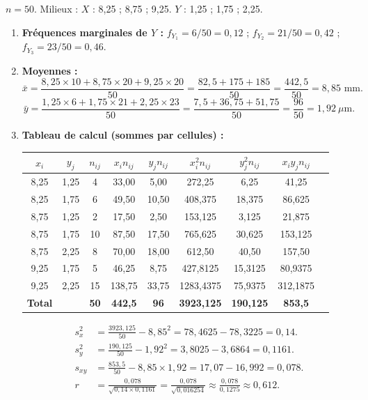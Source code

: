 \documentclass[11pt]{article}
\begin{document}
\begin{corrige}
$n=50$. Milieux : $X$ : 8,25 ; 8,75 ; 9,25. $Y$ : 1,25 ; 1,75 ; 2,25.

\begin{enumerate}
\item \textbf{Fréquences marginales de $Y$ :}
$f_{Y_1} = 6/50 = 0,12$ ; $f_{Y_2} = 21/50 = 0,42$ ; $f_{Y_3} = 23/50 = 0,46$.

\item \textbf{Moyennes :}
\[
\bar{x} = \frac{8,25\times10 + 8,75\times20 + 9,25\times20}{50} = \frac{82,5 + 175 + 185}{50} = \frac{442,5}{50} = 8,85 \text{ mm}.
\]
\[
\bar{y} = \frac{1,25\times6 + 1,75\times21 + 2,25\times23}{50} = \frac{7,5 + 36,75 + 51,75}{50} = \frac{96}{50} = 1,92 \ \mu\text{m}.
\]

\item \textbf{Tableau de calcul (sommes par cellules) :}
\begin{center}
\begin{tabular}{|c|c|c|c|c|c|c|c|c|}\hline
$x_i$ & $y_j$ & $n_{ij}$ & $x_i n_{ij}$ & $y_j n_{ij}$ & $x_i^2 n_{ij}$ & $y_j^2 n_{ij}$ & $x_i y_j n_{ij}$ \\ \hline
8,25 & 1,25 & 4 & 33,00 & 5,00 & 272,25 & 6,25 & 41,25 \\
8,25 & 1,75 & 6 & 49,50 & 10,50 & 408,375 & 18,375 & 86,625 \\
8,75 & 1,25 & 2 & 17,50 & 2,50 & 153,125 & 3,125 & 21,875 \\
8,75 & 1,75 & 10 & 87,50 & 17,50 & 765,625 & 30,625 & 153,125 \\
8,75 & 2,25 & 8 & 70,00 & 18,00 & 612,50 & 40,50 & 157,50 \\
9,25 & 1,75 & 5 & 46,25 & 8,75 & 427,8125 & 15,3125 & 80,9375 \\
9,25 & 2,25 & 15 & 138,75 & 33,75 & 1283,4375 & 75,9375 & 312,1875 \\ \hline
\textbf{Total} & & \textbf{50} & \textbf{442,5} & \textbf{96} & \textbf{3923,125} & \textbf{190,125} & \textbf{853,5} \\ \hline
\end{tabular}
\end{center}

\[
\begin{aligned}
s_x^2 &= \frac{3923,125}{50} - 8,85^2 = 78,4625 - 78,3225 = 0,14. \\
s_y^2 &= \frac{190,125}{50} - 1,92^2 = 3,8025 - 3,6864 = 0,1161. \\
s_{xy} &= \frac{853,5}{50} - 8,85 \times 1,92 = 17,07 - 16,992 = 0,078. \\
r &= \frac{0,078}{\sqrt{0,14 \times 0,1161}} = \frac{0,078}{\sqrt{0,016254}} \approx \frac{0,078}{0,1275} \approx 0,612.
\end{aligned}
\]


\end{enumerate}
\end{corrige}
\end{document}
